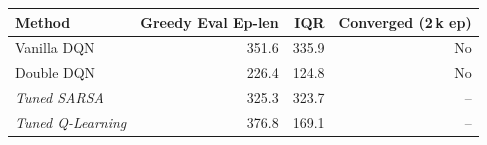 \begin{tabular}{lrrr}
\hline
\textbf{Method} & \textbf{Greedy Eval Ep-len} & \textbf{IQR} & \textbf{Converged (2\,k ep)} \\
\hline
Vanilla DQN & 351.6 & 335.9 & No \\
Double DQN & 226.4 & 124.8 & No \\
\hline
\textit{Tuned SARSA} & 325.3 & 323.7 & -- \\
\textit{Tuned Q-Learning} & 376.8 & 169.1 & -- \\
\hline
\end{tabular}

